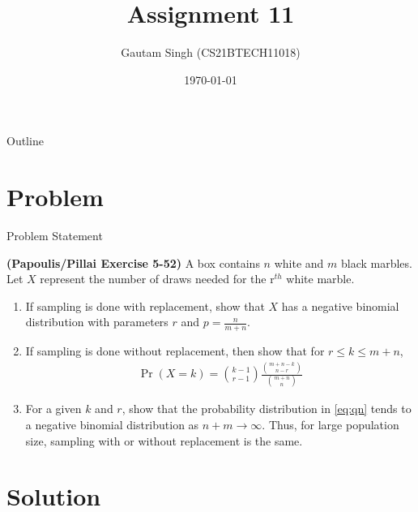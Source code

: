 \documentclass{beamer}
\title{Assignment 11}
\author{Gautam Singh (CS21BTECH11018)}
\date{\today}
\providecommand{\pr}[1]{\ensuremath{\Pr\left(#1\right)}}
\begin{document}
\begin{frame}
    \titlepage 
\end{frame}

\begin{frame}{Outline}
    \tableofcontents
\end{frame}


\section{Problem}
\begin{frame}{Problem Statement}

\textbf{(Papoulis/Pillai Exercise 5-52)}  A box contains $n$ white and $m$ black marbles. Let $X$ represent the number of draws needed for the r$^{th}$ white marble.
\begin{enumerate}
	\item If sampling is done with replacement, show that $X$ has a negative binomial distribution with parameters $r$ and $p = \frac{n}{m + n}$.
	\item If sampling is done without replacement, then show that for $r \leq k \leq m + n$,
		\begin{align}
			\pr{X = k} = \binom{k - 1}{r - 1}\frac{\binom{m + n - k}{n - r}}{\binom{m + n}{n}}
			\label{eq:qn}
		\end{align}
	\item For a given $k$ and $r$, show that the probability distribution in \eqref{eq:qn} tends to a negative binomial distribution as $n + m \to \infty$. Thus, for large population size, sampling with or without replacement is the same.
\end{enumerate}
\end{frame}


\section{Solution}
\end{document}
